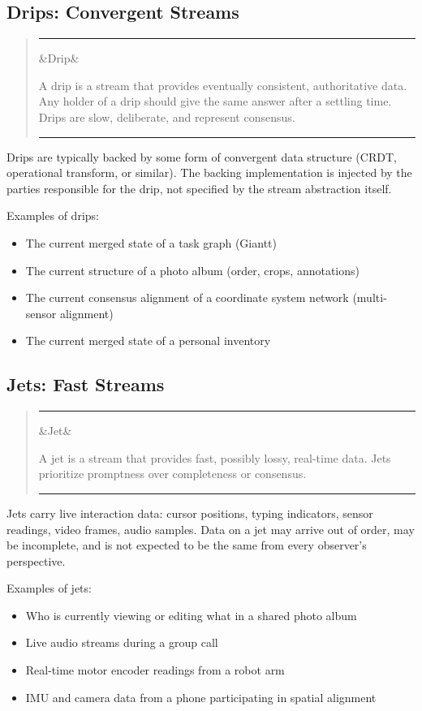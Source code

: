 \documentclass[11pt, letterpaper]{article}
\newenvironment{definition}[1][]
  {\par\medskip\begin{quote}
   \color{rimdark}\rule{\dimexpr\linewidth}{1.5pt}\par\smallskip
   \ifx&#1&\else\noindent{\bfseries #1}\par\smallskip\fi}
  {\par\smallskip\color{rimdark}\rule{\dimexpr\linewidth}{1.5pt}
   \end{quote}\medskip}
\begin{document}
\subsection{Drips: Convergent Streams}

\begin{definition}[Drip]
A drip is a stream that provides eventually consistent, authoritative data. Any holder
of a drip should give the same answer after a settling time. Drips are slow, deliberate,
and represent consensus.
\end{definition}

Drips are typically backed by some form of convergent data structure (CRDT, operational
transform, or similar). The backing implementation is injected by the parties responsible
for the drip, not specified by the stream abstraction itself.

Examples of drips:
\begin{itemize}[leftmargin=2em]
  \item The current merged state of a task graph (Giantt)
  \item The current structure of a photo album (order, crops, annotations)
  \item The current consensus alignment of a coordinate system network (multi-sensor alignment)
  \item The current merged state of a personal inventory
\end{itemize}

\subsection{Jets: Fast Streams}

\begin{definition}[Jet]
A jet is a stream that provides fast, possibly lossy, real-time data. Jets prioritize
promptness over completeness or consensus.
\end{definition}

Jets carry live interaction data: cursor positions, typing indicators, sensor readings,
video frames, audio samples. Data on a jet may arrive out of order, may be incomplete,
and is not expected to be the same from every observer's perspective.

Examples of jets:
\begin{itemize}[leftmargin=2em]
  \item Who is currently viewing or editing what in a shared photo album
  \item Live audio streams during a group call
  \item Real-time motor encoder readings from a robot arm
  \item IMU and camera data from a phone participating in spatial alignment
\end{itemize}
\end{document}
